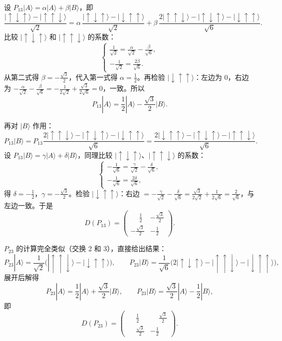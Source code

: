 设 $P_{13}|A\rangle=\alpha|A\rangle+\beta|B\rangle$，即
\[
\frac{|\uparrow\downarrow\uparrow\rangle-|\uparrow\uparrow\downarrow\rangle}{\sqrt{2}}
=\alpha\,\frac{|\uparrow\downarrow\uparrow\rangle-|\downarrow\uparrow\uparrow\rangle}{\sqrt{2}}
+\beta\,\frac{2|\uparrow\uparrow\downarrow\rangle-| \uparrow\downarrow\uparrow\rangle-| \downarrow\uparrow\uparrow\rangle}{\sqrt{6}}.
\]
比较 $|\uparrow\downarrow\uparrow\rangle$ 和 $|\uparrow\uparrow\downarrow\rangle$ 的系数：
\[
\begin{cases}
\displaystyle\frac{1}{\sqrt{2}}=\frac{\alpha}{\sqrt{2}}-\frac{\beta}{\sqrt{6}},\\[8pt]
\displaystyle-\frac{1}{\sqrt{2}}=\frac{2\beta}{\sqrt{6}}.
\end{cases}
\]
从第二式得 $\beta=-\frac{\sqrt{3}}{2}$，代入第一式得 $\alpha=\frac{1}{2}$。再检验 $|\downarrow\uparrow\uparrow\rangle$：左边为 $0$，右边为 $-\frac{\alpha}{\sqrt{2}}-\frac{\beta}{\sqrt{6}}=-\frac{1}{2\sqrt{2}}+\frac{\sqrt{3}}{2\sqrt{6}}=0$，一致。所以
\[
P_{13}|A\rangle=\frac{1}{2}|A\rangle-\frac{\sqrt{3}}{2}|B\rangle.
\]

再对 $|B\rangle$ 作用：
\[
P_{13}|B\rangle=P_{13}\frac{2|\uparrow\uparrow\downarrow\rangle-| \uparrow\downarrow\uparrow\rangle-| \downarrow\uparrow\uparrow\rangle}{\sqrt{6}}
=\frac{2|\downarrow\uparrow\uparrow\rangle-| \uparrow\downarrow\uparrow\rangle-| \uparrow\uparrow\downarrow\rangle}{\sqrt{6}}.
\]
设 $P_{13}|B\rangle=\gamma|A\rangle+\delta|B\rangle$，同理比较 $|\uparrow\downarrow\uparrow\rangle$、$|\uparrow\uparrow\downarrow\rangle$ 的系数：
\[
\begin{cases}
\displaystyle-\frac{1}{\sqrt{6}}=\frac{\gamma}{\sqrt{2}}-\frac{\delta}{\sqrt{6}},\\[8pt]
\displaystyle-\frac{1}{\sqrt{6}}=\frac{2\delta}{\sqrt{6}},
\end{cases}
\]
得 $\delta=-\frac{1}{2}$，$\gamma=-\frac{\sqrt{3}}{2}$。检验 $|\downarrow\uparrow\uparrow\rangle$：右边 $=-\frac{\gamma}{\sqrt{2}}-\frac{\delta}{\sqrt{6}}=\frac{\sqrt{3}}{2\sqrt{2}}+\frac{1}{2\sqrt{6}}=\frac{2}{\sqrt{6}}$，与左边一致。于是
\[
D(P_{13})=\begin{pmatrix}\phantom{-}\tfrac{1}{2}&-\tfrac{\sqrt{3}}{2}\\[4pt]-\tfrac{\sqrt{3}}{2}&-\tfrac{1}{2}\end{pmatrix}.
\]

\textit{$P_{23}$} 的计算完全类似（交换 2 和 3），直接给出结果：
\[
P_{23}|A\rangle=\frac{1}{\sqrt{2}}\bigl(|\uparrow\uparrow\downarrow\rangle-| \downarrow\uparrow\uparrow\rangle\bigr),\qquad
P_{23}|B\rangle=\frac{1}{\sqrt{6}}\bigl(2|\uparrow\downarrow\uparrow\rangle-| \uparrow\uparrow\downarrow\rangle-| \downarrow\uparrow\uparrow\rangle\bigr),
\]
展开后解得
\[
P_{23}|A\rangle=\frac{1}{2}|A\rangle+\frac{\sqrt{3}}{2}|B\rangle,\qquad
P_{23}|B\rangle=\frac{\sqrt{3}}{2}|A\rangle-\frac{1}{2}|B\rangle,
\]
即
\[
D(P_{23})=\begin{pmatrix}\phantom{-}\tfrac{1}{2}&\phantom{-}\tfrac{\sqrt{3}}{2}\\[4pt]\phantom{-}\tfrac{\sqrt{3}}{2}&-\tfrac{1}{2}\end{pmatrix}.
\]

